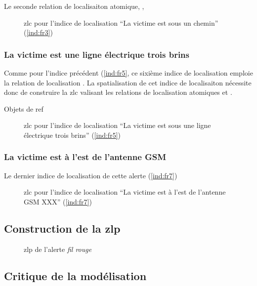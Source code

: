 Le seconde relation de localisaiton atomique, ,


\begin{figure}
  \centering
  
  \caption{\ac{zlc} pour l'indice de localisation \enquote{La victime
      est sous un chemin} (\ref{ind:fr3})}
\end{figure}

\subsubsection{La victime est \protect{} une ligne
  électrique trois brins}

Comme pour l'indice précédent (\ref{ind:fr5}, ce sixième indice de
localisation emploie la relation de localisation
.
%
La spatialisation de cet indice de localisaiton nécessite donc de
construire la \ac{zlc} valisant les relations de localisation
atomiques  et .

Objets de ref

\begin{figure}
  \centering
  
  \caption{\ac{zlc} pour l'indice de localisation \enquote{La victime
      est sous une ligne électrique trois brins} (\ref{ind:fr5})}
\end{figure}


\subsubsection{La victime est à l'est de l'antenne GSM}

Le dernier indice de localisation de cette alerte (\ref{ind:fr7})


\begin{figure}
  \centering
  
  \caption{\ac{zlc} pour l'indice de localisation \enquote{La victime
      est à l'est de l'antenne GSM XXX} (\ref{ind:fr7})}
\end{figure}

\subsection{Construction de la \ac{zlp}}




\begin{figure}
  \centering
  
  \caption{\ac{zlp} de l'alerte \emph{fil rouge}}
  \label{fig:zlp_fil_rouge}
\end{figure}

\subsection{Critique de la modélisation}
\label{subsec:9-4-3}

